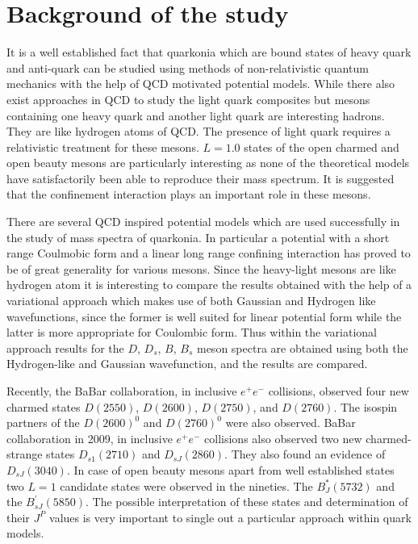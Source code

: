 \documentclass[draft,11pt]{scrreprt}
\begin{document}
\part{Background of the study}
It is a well established fact that quarkonia which are bound states of heavy quark and anti-quark can be studied using methods of non-relativistic quantum mechanics with the help of QCD motivated potential models. While there also exist approaches in QCD to study the light quark composites but mesons containing one heavy quark and another light quark are interesting hadrons. They are like hydrogen atoms of QCD. The presence of light quark requires a relativistic treatment for these mesons. $L=1.0$ states of the open charmed and open beauty mesons are particularly interesting as none of the theoretical models have satisfactorily been able to reproduce their mass spectrum. It is suggested that the confinement interaction plays an important role in these mesons.

There are several QCD inspired potential models which are used successfully in the study of mass spectra of quarkonia. In particular a potential with a short range Coulmobic form and a linear long range confining interaction has proved to be of great generality for various mesons. Since the heavy-light mesons are like hydrogen atom it is interesting to compare the results obtained with the help of a variational approach which makes use of both Gaussian and Hydrogen like wavefunctions, since the former is well suited for linear potential form while the latter is more appropriate for Coulombic form. Thus within the variational approach results for the $D$, $D_s$, $B$, $B_s$ meson spectra are obtained using both the Hydrogen-like and Gaussian wavefunction, and the results are compared.

Recently, the BaBar collaboration, in inclusive $e^{+}e^{-}$ collisions, observed four new charmed states $D(2550)$, $D(2600)$, $D(2750)$, and $D(2760)$\cite{AmoSanchez2010a}. The isospin partners of the $D(2600)^{0}$ and $D(2760)^{0}$ were
also observed. BaBar collaboration in 2009, in inclusive $e^{+}e^{-}$ collisions also observed two new charmed-strange states $D_{s1}(2710)$ and $D_{sJ}(2860)$\cite{Aubert2009}. They also found an evidence of $D_{sJ}(3040)$. In case of open beauty mesons apart from well established states two $L=1$ candidate states were observed in the nineties. The $B_{J}^{*}(5732)$\cite{Abreu1995} and the $B_{sJ}^{\prime}(5850)$\cite{Akers1995}. The possible interpretation of these states and determination of their $J^{P}$ values is very important to single out a particular approach within quark models. 
\end{document}
